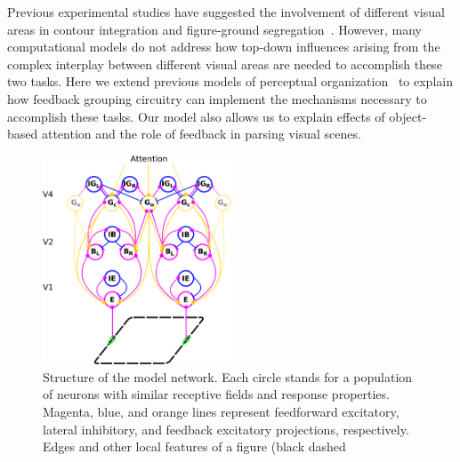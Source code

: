 Previous experimental studies have suggested the involvement of different visual areas in contour integration and figure-ground segregation~\citep{Poort_etal12,Chen_etal14}. However, many computational models do not address how top-down influences arising from the complex interplay between different visual areas are needed to accomplish these two tasks. Here we extend previous models of perceptual organization~\citep{Craft_etal07,Mihalas_etal11b} to explain how feedback grouping circuitry can implement the mechanisms necessary to accomplish these tasks. Our model also allows us to explain
effects of object-based attention and the role of feedback in parsing visual scenes.

\begin{figure}[htbp]
\centering
\includegraphics[width=0.5\textwidth]{Contour/figs/Fig1.eps}
\makeatletter
\let\@currsize\normalsize
\caption{Structure of the model network. Each circle stands for a population of neurons with similar receptive fields and response properties. Magenta, blue, and orange lines represent feedforward excitatory, lateral inhibitory, and feedback excitatory projections, respectively. Edges and other local features of a figure (black dashed
}
\end{figure}
